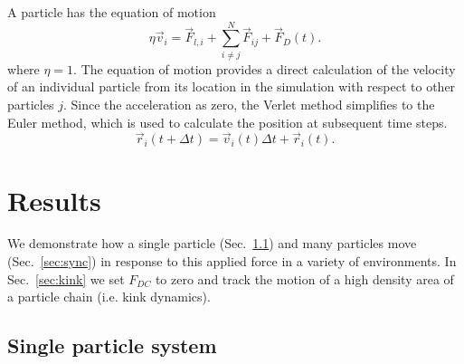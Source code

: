 \documentclass[twocolumn,preprintnumbers,amsmath,amssymb,aps,prx]{revtex4}
\begin{document}
A particle has the equation of motion 
\begin{equation}
\eta \vec{v}_i = \vec{F}_{l,i} + \sum_{i \neq j}^{N} \vec{F}_{ij} + \vec{F}_{D}(t).
\end{equation}
where $\eta = 1$.
The equation of motion provides a direct calculation of the velocity
of an individual particle from its location in the simulation
with respect to other particles $j$.
Since the acceleration as zero,
the Verlet method simplifies to 
the Euler method,
which is used to calculate the position at subsequent time steps.
\begin{equation}
\vec{r}_i(t+\Delta t) = \vec{v}_i(t) \Delta t + \vec{r}_i(t).
\end{equation}

\section{Results}
\label{sec:results}
 We demonstrate how a single particle (Sec.~\ref{sec:one})
 and many particles
 move (Sec.~\ref{sec:sync})
 in response to this applied force in a variety of environments.
 In Sec.~\ref{sec:kink} we set $F_{DC}$
 to zero and track the motion
 of a high density area of a particle chain
 (i.e. kink dynamics).
%
\subsection{Single particle system}
\label{sec:one}
\end{document}
